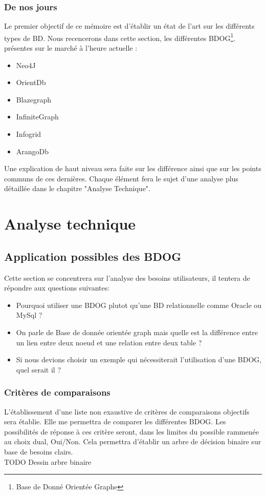 \documentclass[a4paper,12pt,twoside, fleqn]{report}
\begin{document}
\section{De nos jours}	
Le premier objectif de ce mémoire est d'établir un état de l'art sur les différents types de BD. Nous recencerons dans cette section, les différentes BDOG\footnote{Base de Donné Orientée Graphe}. présentes sur le marché à l'heure actuelle :
\begin{itemize}
\item Neo4J
\item OrientDb
\item Blazegraph
\item InfiniteGraph
\item Infogrid
\item ArangoDb
\end{itemize}
Une explication de haut niveau sera faite sur les différence ainsi que sur les points communs de ces dernières. Chaque élément fera le sujet d'une analyse plus détaillée dans le chapitre "Analyse Technique".


\part{Analyse technique}
\chapter{Application possibles des BDOG}
Cette section se concentrera sur l'analyse des besoins utilisateurs, il tentera de répondre aux questions suivantes: 
\begin{itemize}
\item Pourquoi utiliser une BDOG plutot qu'une BD relationnelle comme Oracle ou MySql ?
\item On parle de Base de donnée orientée graph mais quelle est la différence entre un lien entre deux noeud et une relation entre deux table ?
\item Si nous devions choisir un exemple qui nécessiterait l'utilisation d'une BDOG, quel serait il ?
\end{itemize}
\section{Critères de comparaisons}
L'établissement d'une liste non exaustive de critères de comparaisons objectifs sera établie. Elle me permettra de comparer les différentes BDOG. Les possibilités de réponse à ces critère seront, dans les limites du possible rammenée au choix dual, Oui/Non. Cela permettra d'établir un arbre de décision binaire sur base de besoins clairs.\\TODO Dessin arbre binaire
\end{document}
